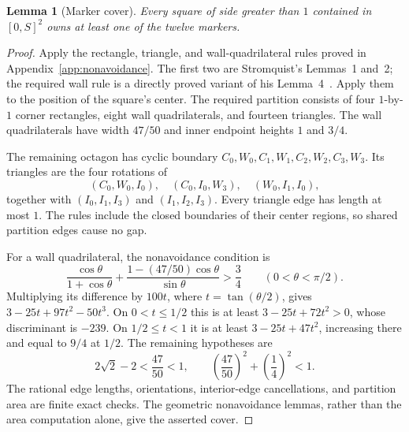 \documentclass[11pt]{article}
\newtheorem{lemma}[theorem]{Lemma}
\begin{document}
\begin{lemma}[Marker cover]
\label{hybrid:marker-cover}
Every square of side greater than $1$ contained in $[0,S]^2$ owns at
least one of the twelve markers.
\end{lemma}
\begin{proof}
Apply the rectangle, triangle, and wall-quadrilateral rules proved in
Appendix~\ref{app:nonavoidance}. The first two are Stromquist's
Lemmas~1 and~2; the required wall rule is a directly proved variant of his
Lemma~4~\cite{stromquist}. Apply them to the position of the square's center.
The required partition
consists of four $1$-by-$1$ corner rectangles, eight wall quadrilaterals,
and fourteen triangles. The wall quadrilaterals have width $47/50$
and inner endpoint heights $1$ and $3/4$.

The remaining octagon has cyclic boundary
$C_0,W_0,C_1,W_1,C_2,W_2,C_3,W_3$. Its triangles are the four rotations of
\[
 (C_0,W_0,I_0),\quad(C_0,I_0,W_3),\quad(W_0,I_1,I_0),
\]
together with $(I_0,I_1,I_3)$ and $(I_1,I_2,I_3)$.
Every triangle edge has length at most $1$. The rules include the closed
boundaries of their center regions, so shared partition edges cause no gap.

For a wall quadrilateral, the nonavoidance condition is
\[
 \frac{\cos\theta}{1+\cos\theta}
 +\frac{1-(47/50)\cos\theta}{\sin\theta}>\frac34
 \qquad(0<\theta<\pi/2).
\]
Multiplying its difference by $100t$, where $t=\tan(\theta/2)$, gives
$3-25t+97t^2-50t^3$. On $0<t\le1/2$ this is at least
$3-25t+72t^2>0$, whose discriminant is $-239$.
On $1/2\le t<1$ it is at least $3-25t+47t^2$, increasing there and
equal to $9/4$ at $1/2$. The remaining hypotheses are
\[
 2\sqrt2-2<\frac{47}{50}<1,
 \qquad \left(\frac{47}{50}\right)^2+\left(\frac14\right)^2<1.
\]
The rational edge lengths, orientations, interior-edge cancellations,
and partition area are finite exact checks. The geometric nonavoidance
lemmas, rather than the area computation alone, give the asserted cover.
\end{proof}
\end{document}

